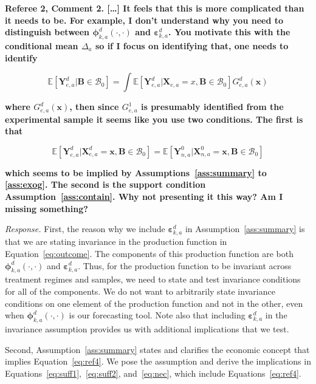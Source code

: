 \noindent \textbf{Referee 2, Comment 2. [\ldots] It feels that this is more complicated than it needs to be. For example, I don't understand why you need to distinguish between $\bm{\phi}_{k,a}^d \left( \cdot, \cdot \right) $ and $\bm{\varepsilon}_{k,a}^d$. You motivate this with the conditional mean $\Delta_a$ so if I focus on identifying that, one needs to identify}

\begin{equation}
\mathbb{E} \left[ \bm{Y}_{e,a}^d | \bm{B} \in \mathcal{B}_0 \right] = \int \mathbb{E} \left[ \bm{Y}_{e,a}^d | \bm{X}_{e,a} = x, \bm{B} \in \mathcal{B}_0 \right] G_{e,a}^d \left( \bm{x} \right)
\end{equation}

\textbf{where $G_{e,a}^d \left( \bm{x} \right)$, then since $G_{e,a}^1$ is presumably identified from the experimental sample it seems like you use two conditions. The first is that}

\begin{equation}
\mathbb{E} \left[  \bm{Y}_{e,a}^d | \bm{X}_{e,a}^d = \bm{x},  \bm{B} \in \mathcal{B}_0 \right] = \mathbb{E} \left[  \bm{Y}_{n,a}^0 | \bm{X}_{n,a}^0 = \bm{x},  \bm{B} \in \mathcal{B}_0 \right]  \label{eq:ref4}
\end{equation}

\textbf{which seems to be implied by Assumptions~\ref{ass:summary} to \ref{ass:exog}. The second is the support condition Assumption~\ref{ass:contain}. Why not presenting it this way? Am I missing something?}

\noindent \textit{Response.} First, the reason why we include $\bm{\varepsilon}_{k,a}^d$ in Assumption~\ref{ass:summary} is that we are stating invariance in the production function in Equation~\eqref{eq:outcome}. The components of this production function are both $\bm{\phi}_{k,a}^d \left( \cdot, \cdot \right) $ and $\bm{\varepsilon}_{k,a}^d$. Thus, for the production function to be invariant across treatment regimes and samples, we need to state and test invariance conditions for all of the components. We do not want to arbitrarily state invariance conditions on one element of the production function and not in the other, even when $\bm{\phi}_{k,a}^d \left( \cdot, \cdot \right) $ is our forecasting tool. Note also that including $\bm{\varepsilon}_{k,a}^d$ in the invariance assumption provides us with additional implications that we test.

Second, Assumption~\ref{ass:summary} states and clarifies the economic concept that implies Equation~\eqref{eq:ref4}. We pose the assumption and derive the implications in Equations~\eqref{eq:suff1},~\eqref{eq:suff2}, and~\eqref{eq:nec},  which include Equations~\eqref{eq:ref4}. 


